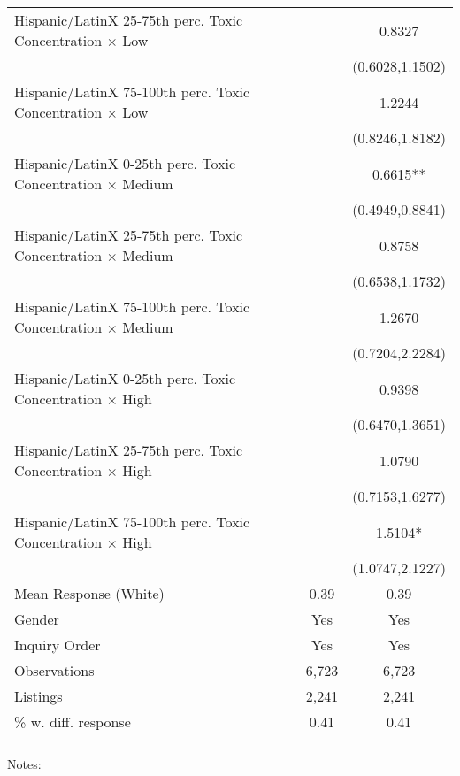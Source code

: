 \begin{table}[H]
\begin{threeparttable}
\begin{tabular}{@{\extracolsep{5pt}}lcc}
Hispanic/LatinX 25-75th perc. Toxic Concentration $\times$ Low&               &      0.8327   \\
                    &               &(0.6028,1.1502)   \\
Hispanic/LatinX 75-100th perc. Toxic Concentration $\times$ Low&               &      1.2244   \\
                    &               &(0.8246,1.8182)   \\
Hispanic/LatinX 0-25th perc. Toxic Concentration $\times$ Medium&               &      0.6615** \\
                    &               &(0.4949,0.8841)   \\
Hispanic/LatinX 25-75th perc. Toxic Concentration $\times$ Medium&               &      0.8758   \\
                    &               &(0.6538,1.1732)   \\
Hispanic/LatinX 75-100th perc. Toxic Concentration $\times$ Medium&               &      1.2670   \\
                    &               &(0.7204,2.2284)   \\
Hispanic/LatinX 0-25th perc. Toxic Concentration $\times$ High&               &      0.9398   \\
                    &               &(0.6470,1.3651)   \\
Hispanic/LatinX 25-75th perc. Toxic Concentration $\times$ High&               &      1.0790   \\
                    &               &(0.7153,1.6277)   \\
Hispanic/LatinX 75-100th perc. Toxic Concentration $\times$ High&               &      1.5104*  \\
                    &               &(1.0747,2.1227)   \\
\hline
 Mean Response (White)&        0.39   &        0.39   \\
\hline Gender       &         Yes   &         Yes   \\
Inquiry Order       &         Yes   &         Yes   \\
\hline Observations &       6,723   &       6,723   \\
Listings            &       2,241   &       2,241   \\
\% w. diff. response&        0.41   &        0.41   \\
 \hline \hline \\[-1.8ex] \end{tabular} \begin{tablenotes} \scriptsize \item Notes: \end{tablenotes} \end{threeparttable} \end{table}         
